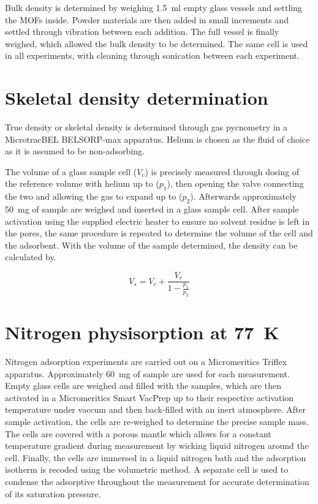 Bulk density is determined by weighing \SI{1.5}{\milli\litre} empty 
glass vessels and settling the MOFs inside. Powder materials are then added
in small increments and settled through vibration between each
addition. The full vessel is finally weighed, which allowed the bulk
density to be determined. The same cell is used in all experiments,
with cleaning through sonication between each experiment.

\section{Skeletal density determination}\label{appx:char:truedensity}

True density or skeletal density is determined through gas pycnometry
in a MicrotracBEL BELSORP-max apparatus. Helium is chosen
as the fluid of choice as it is assumed to be non-adsorbing.

The volume of a glass sample cell (\(V_c\)) is precisely measured through
dosing of the reference volume with helium up to (\(p_1\)), then opening the valve 
connecting the two and allowing the gas to expand up to (\(p_2\)). 
Afterwards approximately \SI{50}{\milli\gram} of sample are weighed
and inserted in a glass sample cell. After sample activation using the
supplied electric heater to ensure no solvent residue is left in the pores,
the same procedure is repeated to determine the volume of the cell
and the adsorbent. With the volume of the sample determined, the
density can be calculated by.

\begin{equation}
%
    V_s = V_c + \frac{V_r}{1- \frac{p_1}{p_2}}
%
\end{equation}


\section{Nitrogen physisorption at \SI{77}{\kelvin}}\label{appx:char:N2phys}

Nitrogen adsorption experiments are carried out on a 
Micromeritics Triflex apparatus. Approximately \SI{60}{\milli\gram}
of sample are used for each measurement.
Empty glass cells are weighed and filled with the samples, which 
are then activated in a Micromeritics Smart VacPrep up to 
their respective activation
temperature under vaccum and then back-filled with an inert
atmosphere. After sample activation, the cells are re-weighed
to determine the precise sample mass. The cells are covered with
a porous mantle which allows for a constant temperature gradient
during measurement by wicking liquid nitrogen around the
cell. Finally, the cells are immersed in a liquid nitrogen bath
and the adsorption isotherm is recoded using the volumetric
method. A separate cell is used to condense the adsorptive 
throughout the measurement for accurate determination of
its saturation pressure.

